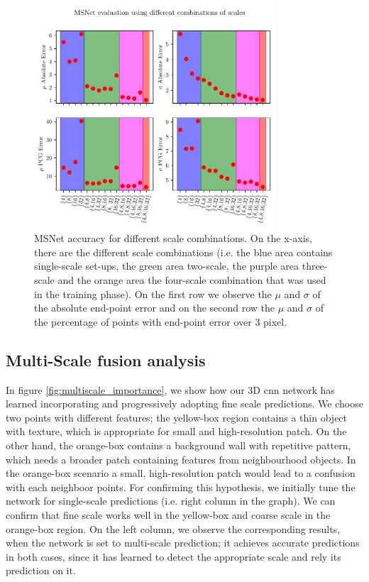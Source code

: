 \documentclass[runningheads]{llncs}
\begin{document}
\begin{figure}[t]
    \centering
    \includegraphics[width=0.8\textwidth]{figures/msnet_scales_evaluation.pdf}
    \caption{MSNet accuracy for different scale combinations. On the x-axis, there are the different scale combinations (i.e. the blue area contains single-scale set-ups, the green area two-scale, the purple area three-scale and the orange area the four-scale combination that was used in the training phase). On the first row we observe the $\mu$ and $\sigma$ of the absolute end-point error and on the second row the $\mu$ and $\sigma$ of the percentage of points with end-point error over 3 pixel.}
    \label{fig:msnet_scales_evaluation}
\end{figure}

\subsection{Multi-Scale fusion analysis} \label{sec:4_1}

In figure \ref{fig:multiscale_importance}, we show how our 3D cnn network has learned incorporating and progressively adopting fine scale predictions. We choose two points with different features; the yellow-box region contains a thin object with texture, which is appropriate for small and high-resolution patch. On the other hand, the orange-box contains a background wall with repetitive pattern, which needs a broader patch containing features from neighbourhood objects. In the orange-box scenario a small, high-resolution patch would lead to a confusion with each neighboor points. For confirming this hypothesis, we initially tune the network for single-scale predictions (i.e. right column in the graph). We can confirm that fine scale works well in the yellow-box and coarse scale in the orange-box region. On the left column, we observe the corresponding results, when the network is set to multi-scale prediction; it achieves accurate predictions in both cases, since it has learned to detect the appropriate scale and rely its prediction on it.
\end{document}
